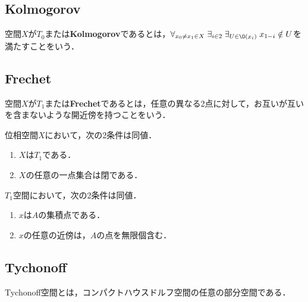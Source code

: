 \documentclass[uplatex,dvipdfmx]{jsreport}
\begin{document}
\subsection{Kolmogorov}

\begin{definition}
    空間$X$が$T_0$または\textbf{Kolmogorov}であるとは，$\forall_{x_0\ne x_1\in X}\;\exists_{i\in2}\;\exists_{U\in\O(x_i)}\;x_{1-i}\notin U$を満たすことをいう．
\end{definition}

\subsection{Frechet}

\begin{definition}
    空間$X$が$T_1$または\textbf{Frechet}であるとは，任意の異なる2点に対して，お互いが互いを含まないような開近傍を持つことをいう．
\end{definition}

\begin{proposition}[$T_1$-性の特徴付け]
    位相空間$X$において，次の2条件は同値．
    \begin{enumerate}
        \item $X$は$T_1$である．
        \item $X$の任意の一点集合は閉である．
    \end{enumerate}
\end{proposition}

\begin{proposition}\label{prop-property-of-T1-spaces}
    $T_1$空間において，次の2条件は同値．
    \begin{enumerate}
        \item $x$は$A$の集積点である．
        \item $x$の任意の近傍は，$A$の点を無限個含む．
    \end{enumerate}
\end{proposition}

\subsection{Tychonoff}

\begin{tcolorbox}[colframe=ForestGreen, colback=ForestGreen!10!white,breakable,colbacktitle=ForestGreen!40!white,coltitle=black,fonttitle=\bfseries\sffamily,
title=]
    Tychonoff空間とは，コンパクトハウスドルフ空間の任意の部分空間である．
\end{tcolorbox}
\end{document}
